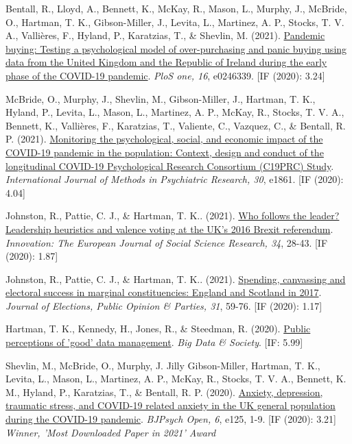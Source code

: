 \documentclass[12pt]{article}
\begin{document}
\begin{bibenum}
	\item Bentall, R., Lloyd, A., Bennett, K., McKay, R., Mason, L., Murphy, J., 
	McBride, O., Hartman, T. K., Gibson-Miller, J., Levita, L., Martinez, A. P., 
	Stocks, T. V. A., Vallières, F., Hyland, P., Karatzias, T., \& Shevlin, M. (2021). 
		\href{https://doi.org/10.1371/journal.pone.0246339}{Pandemic buying: 
		Testing a psychological model of over-purchasing and panic buying 
		using data from the United Kingdom and the Republic of Ireland 
		during the early phase of the COVID-19 pandemic}.
		\emph{PloS one, 16}, e0246339. [IF (2020): 3.24]
	
	\item McBride, O., Murphy, J., Shevlin, M., Gibson-Miller, J., Hartman, T. K., 
	Hyland, P., Levita, L., Mason, L., Martinez, A. P., McKay, R., Stocks, T. V. A., 
	Bennett, K., Vallières, F., Karatzias, T., Valiente, C., Vazquez, C., \& Bentall, R. P. (2021). 
		\href{https://doi.org/10.1002/mpr.1861}{Monitoring the psychological, 
		social, and economic impact of the COVID-19 pandemic in the population: 
		Context, design and conduct of the longitudinal COVID-19 Psychological 
		Research Consortium (C19PRC) Study}.
		\emph{International Journal of Methods in Psychiatric Research, 30}, e1861. [IF (2020): 4.04]
	
	\item Johnston, R., Pattie, C. J., \& {Hartman, T. K.}. (2021). 
		\href{https://doi.org/10.1080/13511610.2020.1746905}
		{Who follows the leader? Leadership heuristics and valence voting 
		at the UK’s 2016 Brexit referendum}.
		\emph{Innovation: The European Journal of Social Science Research, 34}, 
		28-43. [IF (2020): 1.87]

	\item Johnston, R., Pattie, C. J., \& {Hartman, T. K.}. (2021). 
		\href{https://10.1080/17457289.2019.1582534}
		{Spending, canvassing and electoral success in marginal constituencies: 
		England and Scotland in 2017}. 
		\emph{Journal of Elections, Public Opinion \& Parties, 31}, 59-76. [IF (2020): 1.17]
		
	\item Hartman, T. K., Kennedy, H., Jones, R., \& Steedman, R. (2020). 
		\href{https://10.1177/2053951720935616}{Public perceptions of 'good' data management}.
	 	\emph{Big Data \& Society}. [IF: 5.99]
		
	\item Shevlin, M.,  McBride, O., Murphy, J. Jilly Gibson-Miller, Hartman, T. K., 
	Levita, L., Mason, L., Martinez, A. P., McKay, R., Stocks, T. V. A., 
	Bennett, K. M., Hyland, P., Karatzias, T., \& Bentall, R. P. (2020). 
		\href{https://10.1192/bjo.2020.109}{Anxiety, depression, traumatic stress, 
		and COVID-19 related anxiety in the UK general population during the COVID-19 pandemic}.
		\emph{BJPsych Open, 6}, e125, 1-9. [IF (2020): 3.21]\\
		\textit{Winner, 'Most Downloaded Paper in 2021' Award}


\end{bibenum}
\end{document}
